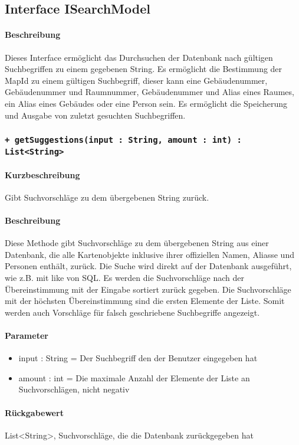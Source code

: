 \subsection{Interface ISearchModel}
\paragraph*{Beschreibung}
Dieses Interface ermöglicht das Durchsuchen der Datenbank nach gültigen Suchbegriffen zu einem gegebenen String.
Es ermöglicht die Bestimmung der MapId zu einem gültigen Suchbegriff, 
dieser kann eine Gebäudenummer, Gebäudenummer und Raumnummer, Gebäudenummer und Alias eines Raumes, ein Alias eines Gebäudes oder eine Person sein.
Es ermöglicht die Speicherung und Ausgabe von zuletzt gesuchten Suchbegriffen.

\subsubsection{\texttt{+ getSuggestions(input : String, amount : int) : List<String>}}%
\paragraph*{Kurzbeschreibung}
Gibt Suchvorschläge zu dem übergebenen String zurück.
\paragraph*{Beschreibung}
Diese Methode gibt Suchvorschläge zu dem übergebenen String aus einer Datenbank, 
die alle Kartenobjekte inklusive ihrer offiziellen Namen, Aliasse und Personen enthält, zurück.
Die Suche wird direkt auf der Datenbank ausgeführt, wie z.B. mit \dq like \dq{} von SQL.
Es werden die Suchvorschläge nach der Übereinstimmung mit der Eingabe sortiert zurück gegeben.
Die Suchvorschläge mit der höchsten Übereinstimmung sind die ersten Elemente der Liste.
Somit werden auch Vorschläge für falsch geschriebene Suchbegriffe angezeigt.
\paragraph*{Parameter}
\begin{itemize}
    \item input : String = Der Suchbegriff den der Benutzer eingegeben hat
    \item amount : int = Die maximale Anzahl der Elemente der Liste an Suchvorschlägen, nicht negativ
\end{itemize}
\paragraph*{Rückgabewert}
List<String>, Suchvorschläge, die die Datenbank zurückgegeben hat

